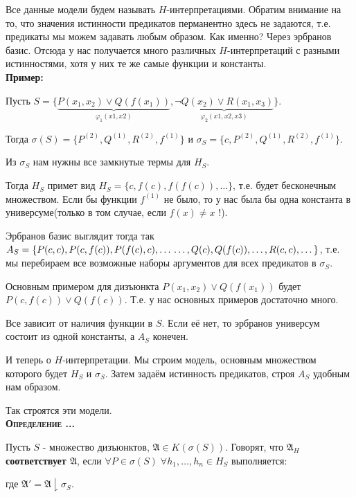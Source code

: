 \documentclass[18pt, a4paper]{extarticle}
\newcounter{par}
\newcounter{spar}
\newcounter{zap}
\newcommand{\opr}{\textbf{\textsc{Определение \thepar.\if\thespar1\thespar.\fi\thezap.\;}}\stepcounter{zap}}
\newcommand{\centr}[1]{\makebox[\linewidth]{#1}}
\newcommand{\primer}{\textbf{Пример:\;}}
\newcommand{\mA}{\mathfrak{A}}
\newcommand{\vp}{\varphi}
\newcommand{\vD}{\vDash}
\newcommand{\sg}{\sigma}
\newcommand{\lot}[3]{#1_#2,\dots,#1_#3}
\begin{document}
Все данные модели будем называть $H$-интерпретациями. Обратим внимание на то, что значения истинности предикатов перманентно здесь не задаются, т.е. предикаты мы можем задавать любым образом. Как именно? Через эрбранов базис. Отсюда у нас получается много различных $H$-интерпретаций с разными истинностями, хотя у них те же самые функции и константы.\\

\primer

Пусть $S=\{\underset{\vp_1(x1,x2)}{\underbrace{P(x_1,x_2)\vee Q(f(x_1))}},\underset{\vp_2(x1,x2,x3)}{\underbrace{\lnot Q(x_2)\vee R(x_1,x_3)}} \}$.

Тогда $\sg(S)=\{P^{(2)},Q^{(1)},R^{(2)},f^{(1)}\}$ и $\sg_S=\{c,P^{(2)},Q^{(1)},R^{(2)},f^{(1)}\}$.

Из $\sg_S$ нам нужны все замкнутые термы для $H_S$. 

Тогда $H_S$ примет вид $H_S=\{c,f(c),f(f(c)),\dots\}$, т.е. будет бесконечным множеством. Если бы функции $f^{(1)}$ не было, то у нас была бы одна константа в универсуме(только в том случае, если $f(x)\neq x$ !).

Эрбранов базис выглядит тогда так $A_S=\{P(c,c),P(c,f(c)),P(f(c),c),\dots\newline\dots,Q(c),Q(f(c)),\dots,R(c,c),\dots\}$, т.е. мы перебираем все возможные наборы аргументов для всех предикатов в $\sg_S$.

Основным примером для дизъюнкта $P(x_1,x_2)\vee Q(f(x_1))$ будет 
\newline$P(c,f(c))\vee Q(f(c))$. Т.е. у нас основных примеров достаточно много. 

Все зависит от наличия функции в $S$. Если её нет, то эрбранов универсум состоит из одной константы, а $A_S$ конечен.

И теперь о $H$-интерпретации. Мы строим модель, основным множеством которого будет $H_S$ и $\sg_S$. Затем задаём истинность предикатов, строя $A_S$ удобным нам образом.

Так строятся эти модели.\\

\opr 

Пусть $S$ - множество дизъюнктов, $\mA\in K(\sg(S))$. Говорят, что \textbf{$\mA_H$ соответствует $\mA$}, если $\forall P\in\sg(S)\;\forall\lot h 1 n\in H_S$ выполняется:
\\\centr{$\mA'\vD P(\lot {h^{\mA'}} 1 n)\Leftrightarrow\mA_H\vD P(\lot h 1 n)$,}

где $\mA'=\mA\downharpoonright\sg_S$.\\
\end{document}
